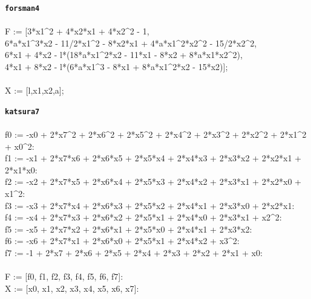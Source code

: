 \documentclass[letterpaper,12pt,titlepage,oneside,final]{book}
\newenvironment{codefont}{\ttfamily}{\par}
\begin{document}
\begin{appendices}
\noindent\textbf{\texttt{forsman4}}\\\\
\noindent\begin{codefont}
  F := [3*x1\^{}2 + 4*x2*x1 + 4*x2\^{}2 - 1,\\
  6*a*x1\^{}3*x2 - 11/2*x1\^{}2 - 8*x2*x1 + 4*a*x1\^{}2*x2\^{}2 - 15/2*x2\^{}2,\\
  6*x1 + 4*x2 - l*(18*a*x1\^{}2*x2 - 11*x1 - 8*x2 + 8*a*x1*x2\^{}2),\\
  4*x1 + 8*x2 - l*(6*a*x1\^{}3 - 8*x1 + 8*a*x1\^{}2*x2 - 15*x2)];\\
        \\
  X := [l,x1,x2,a];\\
\end{codefont}

\noindent\textbf{\texttt{katsura7}}\\\\
\noindent\begin{codefont}
  f0 := -x0 + 2*x7\^{}2 + 2*x6\^{}2 + 2*x5\^{}2 + 2*x4\^{}2 + 2*x3\^{}2 + 2*x2\^{}2 + 2*x1\^{}2 + x0\^{}2:\\
  f1 := -x1 + 2*x7*x6 + 2*x6*x5 + 2*x5*x4 + 2*x4*x3 + 2*x3*x2 + 2*x2*x1 + 2*x1*x0:\\
  f2 := -x2 + 2*x7*x5 + 2*x6*x4 + 2*x5*x3 + 2*x4*x2 + 2*x3*x1 + 2*x2*x0 + x1\^{}2:\\
  f3 := -x3 + 2*x7*x4 + 2*x6*x3 + 2*x5*x2 + 2*x4*x1 + 2*x3*x0 + 2*x2*x1:\\
  f4 := -x4 + 2*x7*x3 + 2*x6*x2 + 2*x5*x1 + 2*x4*x0 + 2*x3*x1 + x2\^{}2:\\
  f5 := -x5 + 2*x7*x2 + 2*x6*x1 + 2*x5*x0 + 2*x4*x1 + 2*x3*x2:\\
  f6 := -x6 + 2*x7*x1 + 2*x6*x0 + 2*x5*x1 + 2*x4*x2 + x3\^{}2:\\
  f7 := -1 + 2*x7 + 2*x6 + 2*x5 + 2*x4 + 2*x3 + 2*x2 + 2*x1 + x0:\\
  \\
  F := [f0, f1, f2, f3, f4, f5, f6, f7]:\\
  X := [x0, x1, x2, x3, x4, x5, x6, x7]:\\
\end{codefont}



\end{appendices}
\end{document}
